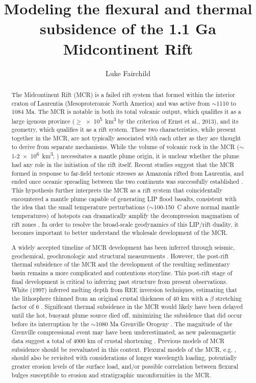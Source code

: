 \documentclass[11pt,letterpaper]{article}
\title{Modeling the flexural and thermal subsidence of the 1.1 Ga Midcontinent Rift}
\author{Luke Fairchild}
\begin{document}
\maketitle{}
\begin{abstract}
The Midcontinent Rift (MCR) is a failed rift system that formed within the interior craton of Laurentia (Mesoproterozoic North America) and was active from $\sim$1110 to 1084 Ma. The MCR is notable in both its total volcanic output, which qualifies it as a large igenous province ($\geq$\SI{e5}{km^3} by the criterion of Ernst et al., 2013\nocite{Ernst2013b}), and its geometry, which qualifies it as a rift system. These two characteristics, while present together in the MCR, are not typically associated with each other as they are thought to derive from separate mechanisms. While the volume of volcanic rock in the MCR ($\sim$1-\SI{2e6}{km^3}; \cite{Hutchinson1990a}) necessitates a mantle plume origin, it is unclear whether the plume had any role in the initiation of the rift itself. Recent studies suggest that the MCR formed in response to far-field tectonic stresses as Amazonia rifted from Laurentia, and ended once oceanic spreading between the two continents was successfully established \cite{Stein2014a}. This hypothesis further interprets the MCR as a rift system that coincidentally encountered a mantle plume capable of generating LIP flood basalts, consistent with the idea that the small temperature perturbations ($\sim$100-150\textdegree\ C above normal mantle temperatures) of hotspots can dramatically amplify the decompression magmatism of rift zones \cite{White1989a}. In order to resolve the broad-scale geodynamics of this LIP/rift duality, it becomes important to better understand the wholesale development of the MCR.\par{}
A widely accepted timeline of MCR development has been inferred through seismic, geochemical, geochronologic and structural measurements \cite{Cannon1989a,Cannon1992b,White1997a,Stein2015a}. However, the post-rift thermal subsidence of the MCR and the development of the resulting sedimentary basin remains a more complicated and contentious storyline. This post-rift stage of final development is critical to inferring past structure from present observations. White (1997)\nocite{White1997a} inferred melting depth from REE inversion techniques, estimating that the lithosphere thinned from an original crustal thickness of 40 km with a $\beta$ stretching factor of 6 \cite{McKenzie1978a}. Significant thermal subsidence in the MCR would likely have been delayed until the hot, buoyant plume source died off, minimizing the subsidence that did occur before its interruption by the $\sim$1080 Ma Grenville Orogeny \cite{White1997a}. The magnitude of the Grenville compressional event may have been underestimated, as new paleomagnetic data suggest a total of 4000 km of crustal shortening \cite{Halls2015a}. Previous models of MCR subsidence should be reevaluated in this context. Flexural models of the MCR, e.g. \cite{Nyquist1988a}, should also be revisited with considerations of longer wavelength loading, potentially greater erosion levels of the surface load, and/or possible correlation between flexural bulges susceptible to erosion and stratigraphic unconformities in the MCR.\par{}

\end{abstract}
\end{document}
